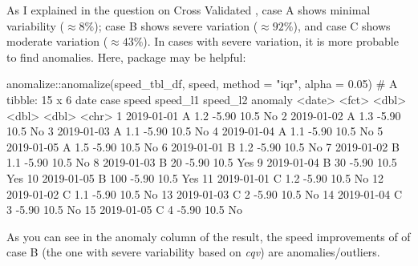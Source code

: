 As I explained in the question on Cross Validated \citep{Beigy_c_2019}, case A shows minimal variability ($ \approx 8\% $); case B shows severe variation ($ \approx 92\% $), and case C shows moderate variation ($ \approx 43\% $). In cases with severe variation, it is more probable to find anomalies. Here,  \citep{Dancho_2018} package may be helpful:

\begin{example}
anomalize::anomalize(speed_tbl_df, speed, method = "iqr", alpha = 0.05)
# A tibble: 15 x 6
   date       case  speed speed_l1 speed_l2 anomaly
   <date>     <fct> <dbl>    <dbl>    <dbl> <chr>  
 1 2019-01-01 A       1.2    -5.90     10.5 No     
 2 2019-01-02 A       1.3    -5.90     10.5 No     
 3 2019-01-03 A       1.1    -5.90     10.5 No     
 4 2019-01-04 A       1.1    -5.90     10.5 No     
 5 2019-01-05 A       1.5    -5.90     10.5 No     
 6 2019-01-01 B       1.2    -5.90     10.5 No     
 7 2019-01-02 B       1.1    -5.90     10.5 No     
 8 2019-01-03 B      20      -5.90     10.5 Yes    
 9 2019-01-04 B      30      -5.90     10.5 Yes    
10 2019-01-05 B     100      -5.90     10.5 Yes    
11 2019-01-01 C       1.2    -5.90     10.5 No     
12 2019-01-02 C       1.1    -5.90     10.5 No     
13 2019-01-03 C       2      -5.90     10.5 No     
14 2019-01-04 C       3      -5.90     10.5 No     
15 2019-01-05 C       4      -5.90     10.5 No    
\end{example}

As you can see in the anomaly column of the result, the speed improvements of  of case B (the one with severe variability based on \emph{cqv}) are anomalies/outliers. 



\address{%
  Maani Beigy\\
  Department of Epidemiology and Biostatistics\\
  School of Public Health\\
  Tehran University of Medical Sciences\\
  Tehran\\
  Iran\\
  ORCiD: 0000-0003-2963-3533\\
  \\
}